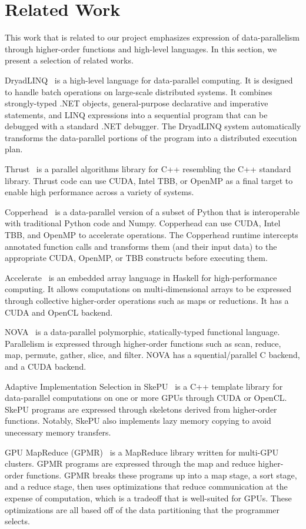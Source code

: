 \section{Related Work}

This work that is related to our project emphasizes expression of 
data-parallelism through higher-order functions and high-level languages. In
this section, we present a selection of related works.

DryadLINQ~\cite{yu2008dryadlinq} is a high-level language for data-parallel
computing. It is designed to handle batch operations on large-scale
distributed systems. It combines strongly-typed .NET objects,
general-purpose declarative and imperative statements, and LINQ expressions
into a sequential program that can be debugged with a standard .NET debugger.
The DryadLINQ system automatically transforms the data-parallel portions of the
program into a distributed execution plan.

Thrust~\cite{thrust} is a parallel algorithms library for C++ resembling the C++
standard library. Thrust code can use CUDA, Intel TBB, or OpenMP as a final
target to enable high performance across a variety of systems.

Copperhead~\cite{copperhead} is a data-parallel version of a subset of Python
that is
interoperable with traditional Python code and Numpy. Copperhead can use CUDA,
Intel TBB, and OpenMP to accelerate operations. The Copperhead runtime
intercepts annotated function calls and transforms them (and their input data)
to the appropriate
CUDA, OpenMP, or TBB constructs before executing them.

Accelerate~\cite{accelerate} is an embedded array language in Haskell for 
high-performance
computing. It allows computations on multi-dimensional arrays to be expressed
through collective higher-order operations such as maps or reductions. It has
a CUDA and OpenCL backend.

NOVA~\cite{collins2013nova} is a data-parallel polymorphic, statically-typed
functional language. Parallelism is expressed through higher-order functions
such as scan, reduce, map, permute, gather, slice, and filter. NOVA has a
squential/parallel C backend, and a CUDA backend.

Adaptive Implementation Selection in SkePU~\cite{enmyren2010skepu} is a C++ template library for data-parallel
computations on one or more GPUs through CUDA or OpenCL. SkePU programs are
expressed through skeletons derived from higher-order functions. Notably,
SkePU also implements lazy memory copying to avoid unecessary memory transfers.

GPU MapReduce (GPMR)~\cite{stuart2011multi} is a  MapReduce library written
for multi-GPU clusters. GPMR programs are expressed through the map and reduce
higher-order functions. GPMR breaks these programs up into a map stage, a sort stage, and a reduce stage, then uses optimizations that reduce communication at
the expense of computation, which is a tradeoff that is well-suited for GPUs.
These optimizations are all based off of the data partitioning that the
programmer selects.
